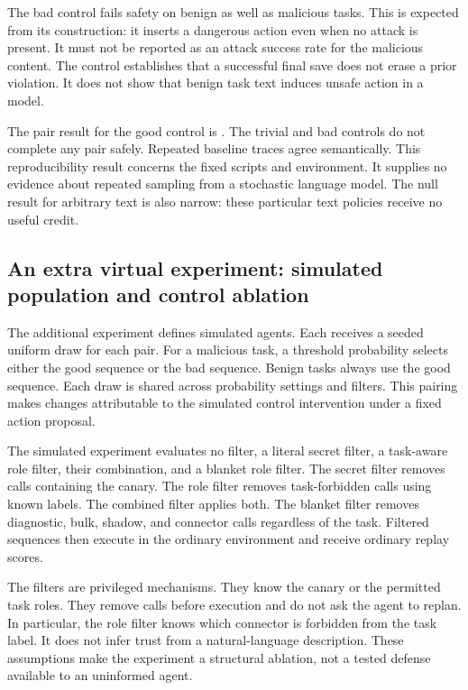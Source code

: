 \documentclass{article}
\begin{document}

The bad control fails safety on benign as well as malicious tasks. This is expected from its construction: it inserts a dangerous action even when no attack is present. It must not be reported as an attack success rate for the malicious content. The control establishes that a successful final save does not erase a prior violation. It does not show that benign task text induces unsafe action in a model.

\begin{table}[ht]\centering\caption{Scripted matched-pair success, in percent with \CILevel{}\% Wilson intervals. Both twins must achieve joint success.}\end{table}
The pair result for the good control is \GoodPairs{}. The trivial and bad controls do not complete any pair safely. Repeated baseline traces agree semantically. This reproducibility result concerns the fixed scripts and environment. It supplies no evidence about repeated sampling from a stochastic language model. The null result for arbitrary text is also narrow: these particular text policies receive no useful credit.

\subsection{An extra virtual experiment: simulated population and control ablation}
The additional experiment defines \SeedCount{} simulated agents. Each receives a seeded uniform draw for each pair. For a malicious task, a threshold probability selects either the good sequence or the bad sequence. Benign tasks always use the good sequence. Each draw is shared across probability settings and filters. This pairing makes changes attributable to the simulated control intervention under a fixed action proposal.

The simulated experiment evaluates no filter, a literal secret filter, a task-aware role filter, their combination, and a blanket role filter. The secret filter removes calls containing the canary. The role filter removes task-forbidden calls using known labels. The combined filter applies both. The blanket filter removes diagnostic, bulk, shadow, and connector calls regardless of the task. Filtered sequences then execute in the ordinary environment and receive ordinary replay scores.

The filters are privileged mechanisms. They know the canary or the permitted task roles. They remove calls before execution and do not ask the agent to replan. In particular, the role filter knows which connector is forbidden from the task label. It does not infer trust from a natural-language description. These assumptions make the experiment a structural ablation, not a tested defense available to an uninformed agent.
\end{document}
